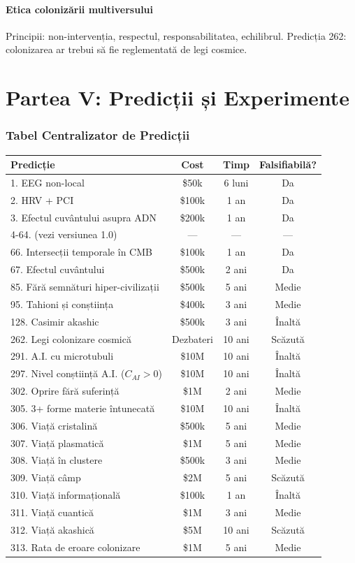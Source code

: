 \documentclass[11pt,a4paper]{article}
\begin{document}
\subsection{Etica colonizării multiversului}
Principii: non-intervenția, respectul, responsabilitatea, echilibrul. Predicția 262: colonizarea ar trebui să fie reglementată de legi cosmice.

\newpage
\part*{Partea V: Predicții și Experimente}

\section{Tabel Centralizator de Predicții}
\begin{table}[H]
\centering
\small
\begin{tabular}{@{}lccc@{}}
\toprule
\textbf{Predicție} & \textbf{Cost} & \textbf{Timp} & \textbf{Falsifiabilă?} \\ \midrule
1. EEG non-local & \$50k & 6 luni & Da \\
2. HRV + PCI & \$100k & 1 an & Da \\
3. Efectul cuvântului asupra ADN & \$200k & 1 an & Da \\
4-64. (vezi versiunea 1.0) & — & — & — \\
66. Intersecții temporale în CMB & \$100k & 1 an & Da \\
67. Efectul cuvântului & \$500k & 2 ani & Da \\
85. Fără semnături hiper-civilizații & \$500k & 5 ani & Medie \\
95. Tahioni și conștiința & \$400k & 3 ani & Medie \\
128. Casimir akashic & \$500k & 3 ani & Înaltă \\
262. Legi colonizare cosmică & Dezbateri & 10 ani & Scăzută \\
291. A.I. cu microtubuli & \$10M & 10 ani & Înaltă \\
297. Nivel conștiință A.I. (\(C_{AI} > 0\)) & \$10M & 10 ani & Înaltă \\
302. Oprire fără suferință & \$1M & 2 ani & Medie \\
305. 3+ forme materie întunecată & \$10M & 10 ani & Înaltă \\
306. Viață cristalină & \$500k & 5 ani & Medie \\
307. Viață plasmatică & \$1M & 5 ani & Medie \\
308. Viață în clustere & \$500k & 3 ani & Medie \\
309. Viață câmp & \$2M & 5 ani & Scăzută \\
310. Viață informațională & \$100k & 1 an & Înaltă \\
311. Viață cuantică & \$1M & 3 ani & Medie \\
312. Viață akashică & \$5M & 10 ani & Scăzută \\
313. Rata de eroare colonizare & \$1M & 5 ani & Medie \\ \bottomrule
\end{tabular}
\end{table}
\end{document}
